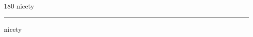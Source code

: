 
\begin{frame}
\begin{center}
\begin{turn}{180}
{\fontsize{2.5cm}{1em}\selectfont nicety}
\end{turn}
\vspace{1em}\par  
\hrule
\vspace{1em}\par  
{\fontsize{2.5cm}{1em}\selectfont nicety}
\end{center}
\end{frame}
